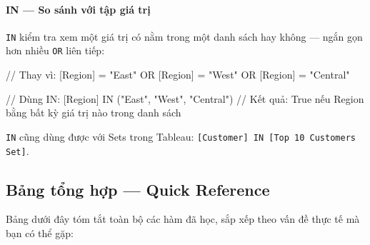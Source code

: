 \documentclass[12pt]{article}
\begin{document}
\paragraph{IN --- So sánh với tập giá trị}

\noindent \texttt{IN} kiểm tra xem một giá trị có nằm trong một danh sách hay không --- ngắn gọn hơn nhiều \texttt{OR} liên tiếp:

\begin{aivncodebox}[]
\begin{python}
// Thay vì:
[Region] = "East" OR [Region] = "West" OR [Region] = "Central"

// Dùng IN:
[Region] IN ("East", "West", "Central")
// Kết quả: True nếu Region bằng bất kỳ giá trị nào trong danh sách
\end{python}
\end{aivncodebox}

\noindent \texttt{IN} cũng dùng được với Sets trong Tableau: \texttt{[Customer] IN [Top 10 Customers Set]}.

\subsection{Bảng tổng hợp --- Quick Reference}

\noindent Bảng dưới đây tóm tắt toàn bộ các hàm đã học, sắp xếp theo vấn đề thực tế mà bạn có thể gặp:
\end{document}
